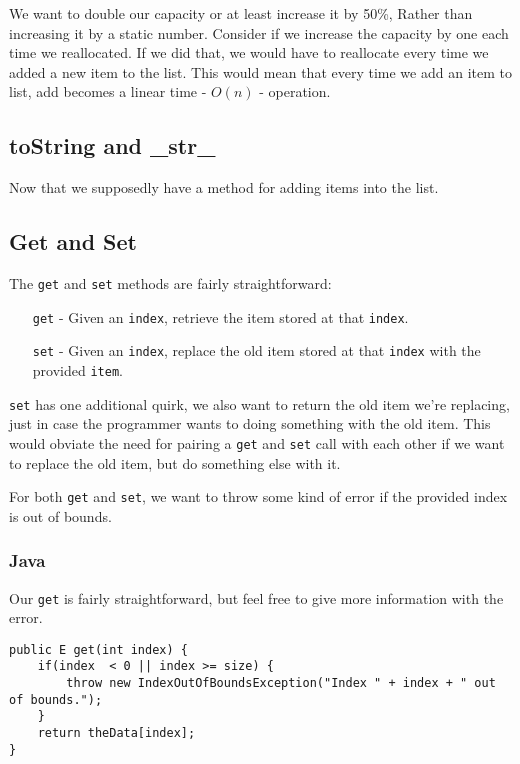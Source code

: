 We want to double our capacity or at least increase it by 50\%, Rather than increasing it by a static number.
Consider if we increase the capacity by one each time we reallocated.  If we did that, we would have to reallocate every time we added a new item to the list.  This would mean that every time we add an item to list, add becomes a linear time - $O(n)$ - operation.


\subsection{toString and \_str\_}
Now that we supposedly have a method for adding items into the list.


\subsection{Get and Set}
The \texttt{get} and \texttt{set} methods are fairly straightforward:
\begin{enumerate}
\item[\texttt{get} -] Given an \texttt{index}, retrieve the item stored at that \texttt{index}.
\item[\texttt{set} -] Given an \texttt{index}, replace the old item stored at that \texttt{index} with the provided \texttt{item}.
\end{enumerate}
\texttt{set} has one additional quirk, we also want to return the old item we're replacing, just in case the programmer wants to doing something with the old item.
This would obviate the need for pairing a \texttt{get} and \texttt{set} call with each other if we want to replace the old item, but do something else with it. 

For both \texttt{get} and \texttt{set}, we want to throw some kind of error if the provided index is out of bounds.
\subsubsection{Java}
Our \texttt{get} is fairly straightforward, but feel free to give more information with the error.
\begin{verbatim}
public E get(int index) {
	if(index  < 0 || index >= size) {
		throw new IndexOutOfBoundsException("Index " + index + " out of bounds.");
	}
	return theData[index];
}
\end{verbatim}

